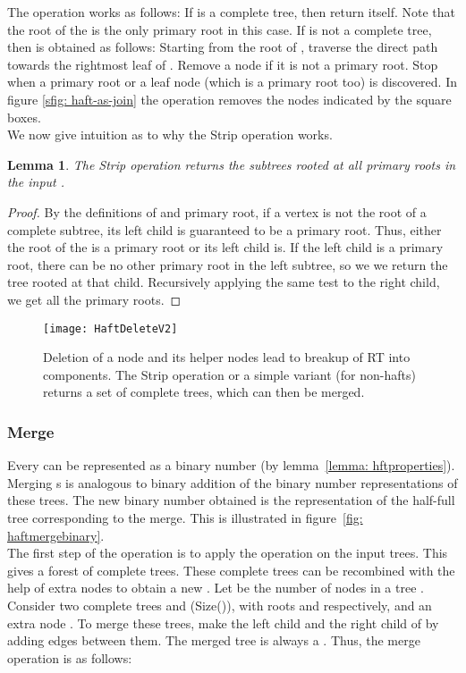 \documentclass[11pt, letter]{article}
\newtheorem{lemma}{Lemma}
\begin{document}
The  operation works as follows: 
 If   is a complete tree, then return  itself. Note that the root of the  is the only primary root in this case. If  is not a complete tree, then  is obtained as follows: Starting from the root of , traverse the  direct path towards the rightmost leaf of . Remove a node if it is not a primary root. Stop when a primary root or a leaf node (which is a primary root too) is discovered. In figure \ref{sfig: haft-as-join} the  operation removes the nodes indicated by the square boxes. \\
We now give intuition as to why the Strip operation works.
\begin{lemma}
The Strip operation returns the subtrees rooted at all primary roots in the input .
\end{lemma}
\begin{proof}
By the definitions of   and primary root, if a vertex is not the root of a complete subtree, its left
child is guaranteed to be a primary root. Thus, either the root of the  is a primary root or its left child is. If
the left child is a primary root, there can be no other primary root in the left subtree, so we we return the tree rooted at that
child.  Recursively applying the same test to the right child, we get all the primary roots. 
\end{proof}

\begin{figure}[h!]
\centering
\texttt{[image: HaftDeleteV2]}
\caption{Deletion of a node and its helper nodes lead to breakup of RT into components. The Strip operation or a simple variant (for non-hafts) returns a set of complete trees, which can then be merged.} 
\label{fig: HaftStripMerge}
\end{figure}

\subsubsection{Merge}
\label{subsec: haftmerge}
 Every  can be represented as a binary number (by lemma~\ref{lemma: hftproperties}).  Merging s
is analogous to binary addition of the  binary number representations of these trees. The new binary number obtained is
the representation of the half-full tree corresponding to the merge. This is illustrated in figure~\ref{fig:
haftmergebinary}.\\
 The first step of the  operation is to apply the   operation on the input trees. This gives a forest of
complete trees.  These complete trees can be recombined with the help of extra nodes to obtain a new . 
Let  be the number of nodes in a tree . Consider two complete trees
 and  (Size()), with roots  and  respectively, and an extra node . To merge
these trees, make  the left child and  the right child of  by adding edges between them. The merged
tree is always a .
 Thus, the merge operation  is as follows:\\
\end{document}
